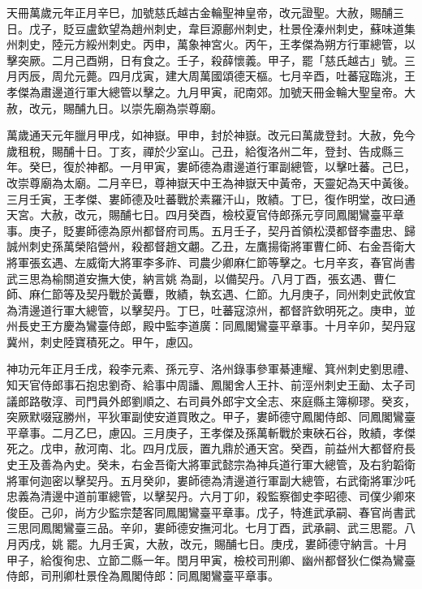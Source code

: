 \begin{pinyinscope}
 天冊萬歲元年正月辛巳，加號慈氏越古金輪聖神皇帝，改元證聖。大赦，賜酺三日。戊子，貶豆盧欽望為趙州刺史，韋巨源鄜州刺史，杜景佺溱州刺史，蘇味道集州刺史，陸元方綏州刺史。丙申，萬象神宮火。丙午，王孝傑為朔方行軍總管，以擊突厥。二月己酉朔，日有食之。壬子，殺薛懷義。甲子，罷「慈氏越古」號。三月丙辰，周允元薨。四月戊寅，建大周萬國頌德天樞。七月辛酉，吐蕃寇臨洮，王孝傑為肅邊道行軍大總管以擊之。九月甲寅，祀南郊。加號天冊金輪大聖皇帝。大赦，改元，賜酺九日。以崇先廟為崇尊廟。



 萬歲通天元年臘月甲戌，如神嶽。甲申，封於神嶽。改元曰萬歲登封。大赦，免今歲租稅，賜酺十日。丁亥，禪於少室山。己丑，給復洛州二年，登封、告成縣三年。癸巳，復於神都。一月甲寅，婁師德為肅邊道行軍副總管，以擊吐蕃。己巳，改崇尊廟為太廟。二月辛巳，尊神嶽天中王為神嶽天中黃帝，天靈妃為天中黃後。三月壬寅，王孝傑、婁師德及吐蕃戰於素羅汗山，敗績。丁巳，復作明堂，改曰通天宮。大赦，改元，賜酺七日。四月癸酉，檢校夏官侍郎孫元亨同鳳閣鸞臺平章事。庚子，貶婁師德為原州都督府司馬。五月壬子，契丹首領松漠都督李盡忠、歸誠州刺史孫萬榮陷營州，殺都督趙文翽。乙丑，左鷹揚衛將軍曹仁師、右金吾衛大將軍張玄遇、左威衛大將軍李多祚、司農少卿麻仁節等擊之。七月辛亥，春官尚書武三思為榆關道安撫大使，納言姚為副，以備契丹。八月丁酉，張玄遇、曹仁師、麻仁節等及契丹戰於黃麞，敗績，執玄遇、仁節。九月庚子，同州刺史武攸宜為清邊道行軍大總管，以擊契丹。丁巳，吐蕃寇涼州，都督許欽明死之。庚申，並州長史王方慶為鸞臺侍郎，殿中監李道廣：同鳳閣鸞臺平章事。十月辛卯，契丹寇冀州，刺史陸寶積死之。甲午，慮囚。



 神功元年正月壬戌，殺李元素、孫元亨、洛州錄事參軍綦連耀、箕州刺史劉思禮、知天官侍郎事石抱忠劉奇、給事中周譒、鳳閣舍人王抃、前涇州刺史王勔、太子司議郎路敬淳、司門員外郎劉順之、右司員外郎宇文全志、來庭縣主簿柳璆。癸亥，突厥默啜寇勝州，平狄軍副使安道買敗之。甲子，婁師德守鳳閣侍郎、同鳳閣鸞臺平章事。二月乙巳，慮囚。三月庚子，王孝傑及孫萬斬戰於東硤石谷，敗績，孝傑死之。戊申，赦河南、北。四月戊辰，置九鼎於通天宮。癸酉，前益州大都督府長史王及善為內史。癸未，右金吾衛大將軍武懿宗為神兵道行軍大總管，及右豹韜衛將軍何迦密以擊契丹。五月癸卯，婁師德為清邊道行軍副大總管，右武衛將軍沙吒忠義為清邊中道前軍總管，以擊契丹。六月丁卯，殺監察御史李昭德、司僕少卿來俊臣。己卯，尚方少監宗楚客同鳳閣鸞臺平章事。戊子，特進武承嗣、春官尚書武三思同鳳閣鸞臺三品。辛卯，婁師德安撫河北。七月丁酉，武承嗣、武三思罷。八月丙戌，姚罷。九月壬寅，大赦，改元，賜酺七日。庚戌，婁師德守納言。十月甲子，給復徇忠、立節二縣一年。閏月甲寅，檢校司刑卿、幽州都督狄仁傑為鸞臺侍郎，司刑卿杜景佺為鳳閣侍郎：同鳳閣鸞臺平章事。




\end{pinyinscope}
